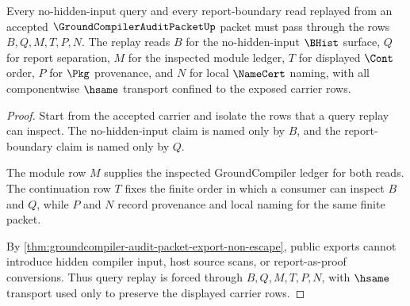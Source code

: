 \begin{theorem}
\label{thm:groundcompiler-audit-packet-query-replay}
Every no-hidden-input query and every report-boundary read replayed from an accepted $\GroundCompilerAuditPacketUp$ packet must pass through the rows $B,Q,M,T,P,N$. The replay reads $B$ for the no-hidden-input $\BHist$ surface, $Q$ for report separation, $M$ for the inspected module ledger, $T$ for displayed $\Cont$ order, $P$ for $\Pkg$ provenance, and $N$ for local $\NameCert$ naming, with all componentwise $\hsame$ transport confined to the exposed carrier rows.
\end{theorem}
\begin{proof}
Start from the accepted carrier and isolate the rows that a query replay can inspect. The no-hidden-input claim is named only by $B$, and the report-boundary claim is named only by $Q$.

The module row $M$ supplies the inspected GroundCompiler ledger for both reads. The continuation row $T$ fixes the finite order in which a consumer can inspect $B$ and $Q$, while $P$ and $N$ record provenance and local naming for the same finite packet.

By \autoref{thm:groundcompiler-audit-packet-export-non-escape}, public exports cannot introduce hidden compiler input, host source scans, or report-as-proof conversions. Thus query replay is forced through $B,Q,M,T,P,N$, with $\hsame$ transport used only to preserve the displayed carrier rows.
\end{proof}

